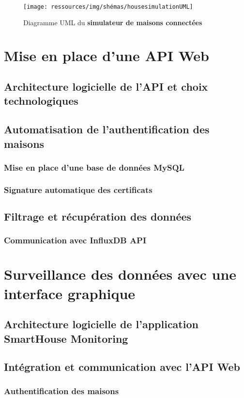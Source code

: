 \documentclass[10pt, a4paper]{report}
\begin{document}
		\begin{figure}[h!]
		\centering
		\texttt{[image: ressources/img/shémas/housesimulationUML]}
		\caption{Diagramme UML du \textbf{simulateur de maisons connectées}}
		\label{fig:umlMaisonConnectées}
	\end{figure}
	
	\section{Mise en place d'une API Web}
	\subsection{Architecture logicielle de l'API et choix technologiques}
	\subsection{Automatisation de l'authentification des maisons}
	\subsubsection{Mise en place d'une base de données MySQL}
	\subsubsection{Signature automatique des certificats}
	\subsection{Filtrage et récupération des données}
	\subsubsection{Communication avec InfluxDB API}
	
	\section{Surveillance des données avec une interface graphique}
	\subsection{Architecture logicielle de l'application SmartHouse Monitoring}
	\subsection{Intégration et communication avec l'API Web}
	\subsubsection{Authentification des maisons}
\end{document}
